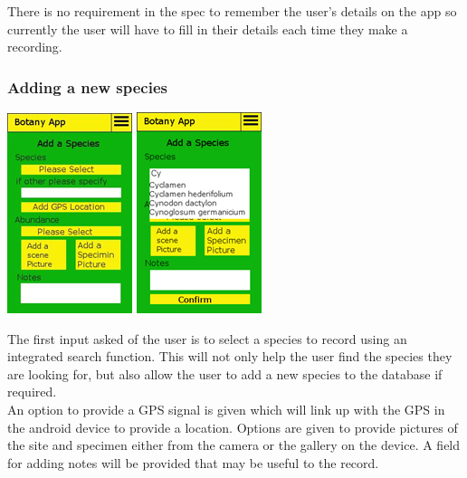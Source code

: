 		There is no requirement in the spec to remember the user’s details on the app so currently the user will have to fill in their details each time they make a recording.\\
		
	\subsubsection{Adding a new species}
		\begin{center}
			\includegraphics[scale=0.5]{uiDesign/botanyAppAddSpecies1.png}
			\includegraphics[scale=0.5]{uiDesign/botanyAppAddSpecies2.png}
		\end{center}
		The first input asked of the user is to select a species to record using an integrated search function. This will not only help the user find the species they are looking for, but also allow the user to add a new species to the database if required.\\
		
		An option to provide a GPS signal is given which will link up with the GPS in the android device to provide a location. Options are given to provide pictures of the site and specimen either from the camera or the gallery on the device. A field for adding notes will be provided that may be useful to the record.\\
	
